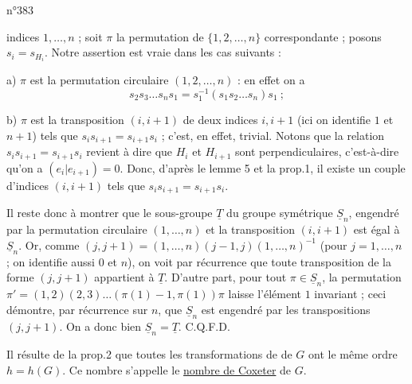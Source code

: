 \hfill n°383

indices $1,\ldots,n$ ; soit $\pi$ la permutation de $\{1,2,\ldots,n\}$ correspondante ; posons $s_i=s_{H_i}$. Notre assertion est vraie dans les cas suivants :

a) $\pi$ est la permutation circulaire $(1,2,\ldots,n)$ : en effet on a
\[
s_2s_3\ldots s_ns_1=s_1^{-1}(s_1s_2\ldots s_n)s_1\ ;
\]

b) $\pi$ est la transposition $(i,i+1)$ de deux indices $i,i+1$ (ici on identifie $1$ et $n+1$) tels que $s_is_{i+1}=s_{i+1}s_i$ ; c'est, en effet, trivial. Notons que la relation $s_is_{i+1}=s_{i+1}s_i$ revient à dire que $H_i$ et $H_{i+1}$ sont perpendiculaires, c'est-à-dire qu'on a $(e_i|e_{i+1})=0$. Donc, d'après le lemme 5 et la prop.1, il existe un couple d'indices $(i,i+1)$ tels que $s_is_{i+1}=s_{i+1}s_i$.

Il reste donc à montrer que le sous-groupe $\underline{T}$ du groupe symétrique $\underline{S}_n$, engendré par la permutation circulaire $(1,\ldots,n)$ et la transposition $(i,i+1)$ est égal à $\underline{S}_n$. Or, comme $(j,j+1)=(1,\ldots,n)(j-1,j)(1,\ldots,n)^{-1}$ (pour $j=1,\ldots,n$ ; on identifie aussi $0$ et $n$), on voit par récurrence que toute transposition de la forme $(j,j+1)$ appartient à $\underline{T}$. D'autre part, pour tout $\pi\in\underline{S}_n$, la permutation $\pi'=(1,2)(2,3)\ldots(\pi(1)-1,\pi(1))\pi$ laisse l'élément $1$ invariant ; ceci démontre, par récurrence sur $n$, que $\underline{S}_n$ est engendré par les transpositions $(j,j+1)$. On a donc bien $\underline{S}_n=\underline{T}$. C.Q.F.D.

Il résulte de la prop.2 que toutes les transformations de  de $G$ ont le même ordre $h=h(G)$. Ce nombre s'appelle le \uline{nombre de Coxeter} de $G$.

